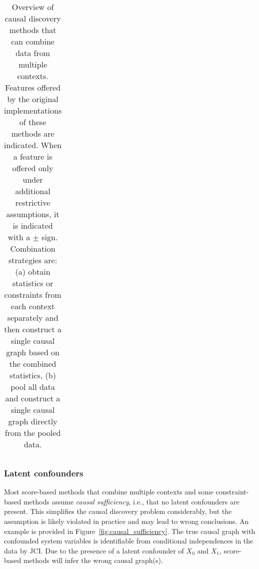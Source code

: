 \documentclass[twoside,11pt]{article}
\begin{document}
\begin{table}
\begin{tabular}{lcccccccccccccccc}
  \hline
\end{tabular}
  \caption{Overview of causal discovery methods that can combine data from multiple contexts. Features offered by the original implementations of these methods are indicated. When a feature is offered only under additional restrictive assumptions, it is indicated with a $\pm$ sign. Combination strategies are: (a) obtain statistics or constraints from each context separately and then construct a single causal graph based on the combined statistics, (b) pool all data and construct a single causal graph directly from the pooled data.\label{tab:related_work}}
\end{table}

\subsubsection{Latent confounders}
Most score-based methods that combine multiple contexts 
\citep[like the ones by][]{CooperYoo1999,TianPearl2001,SPP05,EatonMurphy07,GIES2012,MooijHeskes_UAI_13,oates2016estimating} 
and some constraint-based methods \citep{Zhang++_IJCAI17,YangKatcoffUhler2018} assume \emph{causal sufficiency}, i.e., 
that no latent confounders are present. This simplifies the causal discovery 
problem considerably, but the assumption is likely violated in practice and may lead to wrong conclusions.
An example is provided in Figure~\ref{fig:causal_sufficiency}.
The true causal graph with confounded system variables is identifiable from conditional independences in the data by JCI. 
Due to the presence of a latent confounder of $X_0$ and $X_1$, 
score-based methods will infer the wrong causal graph(s). 
\end{document}
